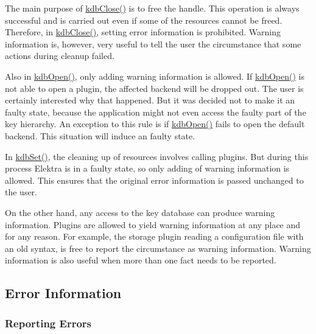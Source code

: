 \begin{DoxyItemize}
\item The main purpose of {\ttfamily \hyperlink{group__kdb_gadb54dc9fda17ee07deb9444df745c96f}{kdb\+Close()}} is to free the handle. This operation is always successful and is carried out even if some of the resources cannot be freed. Therefore, in {\ttfamily \hyperlink{group__kdb_gadb54dc9fda17ee07deb9444df745c96f}{kdb\+Close()}}, setting error information is prohibited. Warning information is, however, very useful to tell the user the circumstance that some actions during cleanup failed.
\item Also in {\ttfamily \hyperlink{group__kdb_ga6808defe5870f328dd17910aacbdc6ca}{kdb\+Open()}}, only adding warning information is allowed. If {\ttfamily \hyperlink{group__kdb_ga6808defe5870f328dd17910aacbdc6ca}{kdb\+Open()}} is not able to open a plugin, the affected backend will be dropped out. The user is certainly interested why that happened. But it was decided not to make it an faulty state, because the application might not even access the faulty part of the key hierarchy. An exception to this rule is if {\ttfamily \hyperlink{group__kdb_ga6808defe5870f328dd17910aacbdc6ca}{kdb\+Open()}} fails to open the default backend. This situation will induce an faulty state.
\item In {\ttfamily \hyperlink{group__kdb_ga11436b058408f83d303ca5e996832bcf}{kdb\+Set()}}, the cleaning up of resources involves calling plugins. But during this process Elektra is in a faulty state, so only adding of warning information is allowed. This ensures that the original error information is passed unchanged to the user.
\end{DoxyItemize}

On the other hand, any access to the key database can produce warning information. Plugins are allowed to yield warning information at any place and for any reason. For example, the storage plugin reading a configuration file with an old syntax, is free to report the circumstance as warning information. Warning information is also useful when more than one fact needs to be reported.

\subsection*{Error Information}

\subsubsection*{Reporting Errors}

